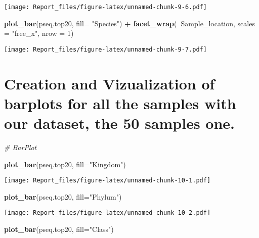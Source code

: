 \documentclass[]{article}
\newenvironment{Shaded}{\begin{snugshade}}{\end{snugshade}}
\newcommand{\CommentTok}[1]{\textcolor[rgb]{0.56,0.35,0.01}{\textit{#1}}}
\newcommand{\DataTypeTok}[1]{\textcolor[rgb]{0.13,0.29,0.53}{#1}}
\newcommand{\DecValTok}[1]{\textcolor[rgb]{0.00,0.00,0.81}{#1}}
\newcommand{\KeywordTok}[1]{\textcolor[rgb]{0.13,0.29,0.53}{\textbf{#1}}}
\newcommand{\NormalTok}[1]{#1}
\newcommand{\OperatorTok}[1]{\textcolor[rgb]{0.81,0.36,0.00}{\textbf{#1}}}
\newcommand{\StringTok}[1]{\textcolor[rgb]{0.31,0.60,0.02}{#1}}
\begin{document}
\texttt{[image: Report\_files/figure-latex/unnamed-chunk-9-6.pdf]}

\begin{Shaded}
\begin{Highlighting}[]
\KeywordTok{plot_bar}\NormalTok{(pseq.top20, }\DataTypeTok{fill=} \StringTok{"Species"}\NormalTok{) }\OperatorTok{+}\StringTok{ }\KeywordTok{facet_wrap}\NormalTok{(}\OperatorTok{~}\NormalTok{Sample_location, }\DataTypeTok{scales =} \StringTok{"free_x"}\NormalTok{, }\DataTypeTok{nrow =} \DecValTok{1}\NormalTok{)}
\end{Highlighting}
\end{Shaded}

\texttt{[image: Report\_files/figure-latex/unnamed-chunk-9-7.pdf]}

\hypertarget{creation-and-vizualization-of-barplots-for-all-the-samples-with-our-dataset-the-50-samples-one.}{%
\section{Creation and Vizualization of barplots for all the samples with
our dataset, the 50 samples
one.}\label{creation-and-vizualization-of-barplots-for-all-the-samples-with-our-dataset-the-50-samples-one.}}

\begin{Shaded}
\begin{Highlighting}[]
\CommentTok{# BarPlot }

\KeywordTok{plot_bar}\NormalTok{(pseq.top20, }\DataTypeTok{fill=}\StringTok{"Kingdom"}\NormalTok{)}
\end{Highlighting}
\end{Shaded}

\texttt{[image: Report\_files/figure-latex/unnamed-chunk-10-1.pdf]}

\begin{Shaded}
\begin{Highlighting}[]
\KeywordTok{plot_bar}\NormalTok{(pseq.top20, }\DataTypeTok{fill=}\StringTok{"Phylum"}\NormalTok{)}
\end{Highlighting}
\end{Shaded}

\texttt{[image: Report\_files/figure-latex/unnamed-chunk-10-2.pdf]}

\begin{Shaded}
\begin{Highlighting}[]
\KeywordTok{plot_bar}\NormalTok{(pseq.top20, }\DataTypeTok{fill=}\StringTok{"Class"}\NormalTok{)}
\end{Highlighting}
\end{Shaded}
\end{document}
